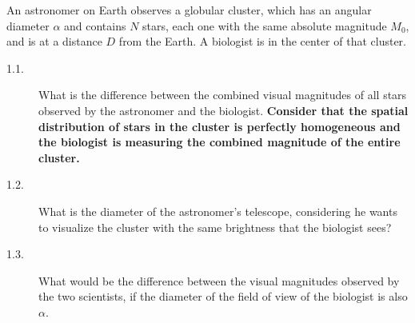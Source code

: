 An astronomer on Earth observes a globular cluster, which has an angular
diameter $\alpha$ and contains $N$ stars, each one with the same absolute
magnitude $M_0$, and is at a distance $D$ from the Earth. A biologist is in
the center of that cluster.
\begin{description}
\item[1.1.] What is the difference between the combined visual magnitudes of
  all stars observed by the astronomer and the biologist. \textbf{Consider
  that the spatial distribution of stars in the cluster is perfectly
  homogeneous and the biologist is measuring the combined magnitude of the
  entire cluster.}
\item[1.2.] What is the diameter of the astronomer's telescope, considering
  he wants to visualize the cluster with the same brightness that the
  biologist sees?
\item[1.3.] What would be the difference between the visual magnitudes
  observed by the two scientists, if the diameter of the field of view of
  the biologist is also $\alpha$.
\end{description}
